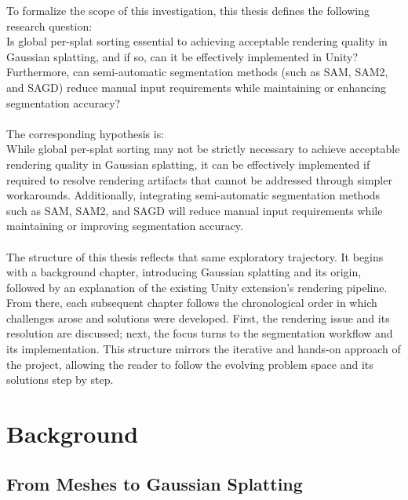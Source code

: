 \documentclass[12pt]{article}
\begin{document}
To formalize the scope of this investigation, this thesis defines the following research question:\\
Is global per-splat sorting essential to achieving acceptable rendering quality in Gaussian splatting, and if so, can it be effectively implemented in Unity? Furthermore, can semi-automatic segmentation methods (such as SAM, SAM2, and SAGD) reduce manual input requirements while maintaining or enhancing segmentation accuracy?
\\\\
The corresponding hypothesis is:
\\
While global per-splat sorting may not be strictly necessary to achieve acceptable rendering quality in Gaussian splatting, it can be effectively implemented if required to resolve rendering artifacts that cannot be addressed through simpler workarounds. Additionally, integrating semi-automatic segmentation methods such as SAM, SAM2, and SAGD will reduce manual input requirements while maintaining or improving segmentation accuracy.
\\\\
The structure of this thesis reflects that same exploratory trajectory. It begins with a background chapter, introducing Gaussian splatting and its origin, followed by an explanation of the existing Unity extension’s rendering pipeline. From there, each subsequent chapter follows the chronological order in which challenges arose and solutions were developed. First, the rendering issue and its resolution are discussed; next, the focus turns to the segmentation workflow and its implementation. This structure mirrors the iterative and hands-on approach of the project, allowing the reader to follow the evolving problem space and its solutions step by step.
\section{Background}
\subsection{From Meshes to Gaussian Splatting}
\end{document}

